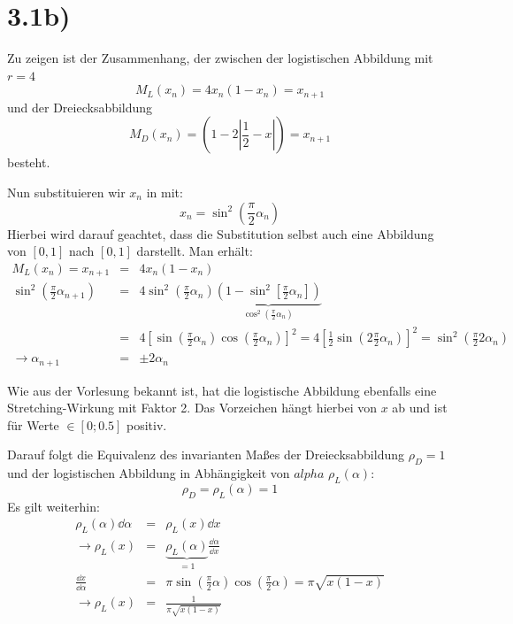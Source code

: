 \section*{3.1b)}

Zu zeigen ist der Zusammenhang, der zwischen der logistischen Abbildung mit $r = 4$
\begin{equation}
 M_L(x_n) = 4x_n(1-x_n) = x_{n+1}
 \label{eqn:ml}
\end{equation}
und der Dreiecksabbildung
\begin{equation}
 \label{eqn:md}
 M_D(x_n) = \left(1-2\left|\frac{1}{2}-x\right|\right) = x_{n+1}
\end{equation}
besteht.

Nun substituieren wir $x_n$ in  mit:
\begin{equation}
 x_n = \sin^2\left(\frac{\pi}{2}\alpha_n\right)
\end{equation}
Hierbei wird darauf geachtet, dass die Substitution selbst auch eine Abbildung
von $[0, 1]$ nach $[0, 1]$ darstellt. Man erhält:
\begin{eqnarray}
 M_L(x_n) = x_{n+1} &=& 4x_n(1-x_n) \\
 \sin^2\left(\frac{\pi}{2}\alpha_{n+1}\right) &=& 4\sin^2\left(\frac{\pi}{2}\alpha_n\right)\underbrace{\left(1-\sin^2\left[\frac{\pi}{2}\alpha_n\right]\right)}_{\cos^2\left(\frac{\pi}{2}\alpha_n\right)} \\
 &=& 4\left[ \sin\left(\frac{\pi}{2}\alpha_n\right)\cos\left(\frac{\pi}{2}\alpha_n\right)\right]^2 = 4 \left[ \frac{1}{2} \sin\left( 2 \frac{\pi}{2} \alpha_n \right) \right]^2 = \sin^2\left(\frac{\pi}{2}2\alpha_n\right) \\
 \rightarrow \alpha_{n+1} &=& \pm 2 \alpha_n
\end{eqnarray}

Wie aus der Vorlesung bekannt ist, hat die logistische Abbildung ebenfalls eine
Stretching-Wirkung mit Faktor 2. Das Vorzeichen hängt hierbei von $x$ ab und ist
für Werte $\in [0; 0.5]$ positiv.

Darauf folgt die Equivalenz des invarianten Maßes der Dreiecksabbildung $ρ_D = 1$
und der logistischen Abbildung in Abhängigkeit von $alpha$ $ρ_L(α)$:
\begin{equation}
 ρ_D = ρ_L(α) = 1 
\end{equation}
Es gilt weiterhin:
\begin{eqnarray}
 ρ_L(α)\dd{α} &=& ρ_L(x)\dd{x} \\
  \rightarrow ρ_L(x) &=& \underbrace{ρ_L(α)}_{=1} \frac{\dd{\alpha}}{\dd{x}} \\
 \frac{\dd{x}}{\dd{α}} &=&  π \sin\left(\frac{\pi}{2}\alpha\right)\cos\left(\frac{\pi}{2}\alpha\right) = π\sqrt{x(1-x)} \\
 \rightarrow ρ_L(x) &=& \frac{1}{\pi\sqrt{x(1-x)}}
\end{eqnarray}

